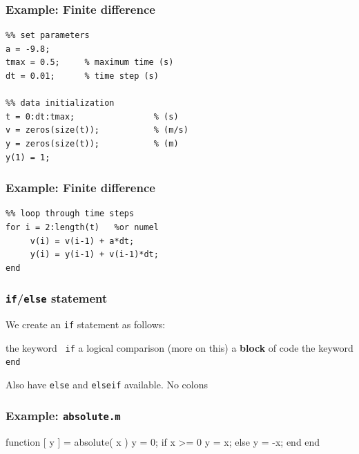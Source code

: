 \documentclass[11pt]{beamer}
\begin{document}
\begin{frame}[fragile]
  \frametitle{Example: Finite difference}

  \begin{Verbatim}
%% set parameters
a = -9.8;
tmax = 0.5;     % maximum time (s)
dt = 0.01;      % time step (s)

%% data initialization
t = 0:dt:tmax;                % (s)
v = zeros(size(t));           % (m/s)
y = zeros(size(t));           % (m)
y(1) = 1;
  \end{Verbatim}
\end{frame}

\begin{frame}[fragile]
  \frametitle{Example: Finite difference}

  \begin{Verbatim}
%% loop through time steps
for i = 2:length(t)   %or numel
     v(i) = v(i-1) + a*dt;
     y(i) = y(i-1) + v(i-1)*dt;
end
  \end{Verbatim}
\end{frame}


\begin{frame}[fragile]
  \frametitle{\texttt{if}/\texttt{else} statement}
  \Enlarge

  \begin{itemize}
  \myitem  We create an \texttt{if} statement as follows:
    \begin{itemize}
    \mysubitem  the keyword \texttt{\color{red} if}
    \mysubitem  a logical comparison  (more on this)
    \mysubitem  a \textbf{block} of code 
    \mysubitem  the keyword \texttt{\color{red} end}
    \end{itemize}
  \myitem Also have \texttt{else} and \texttt{elseif} available.
  \myitem No colons
  \end{itemize}
\end{frame}

\begin{frame}[fragile]
  \frametitle{Example:  \texttt{absolute.m}}
  \Enlarge

  \begin{semiverbatim}
function [ y ] = absolute( x )
    y = 0;
    if x >= 0
        y = x;
    else
        y = -x;
    end
end
  \end{semiverbatim}
\end{frame}
\end{document}
